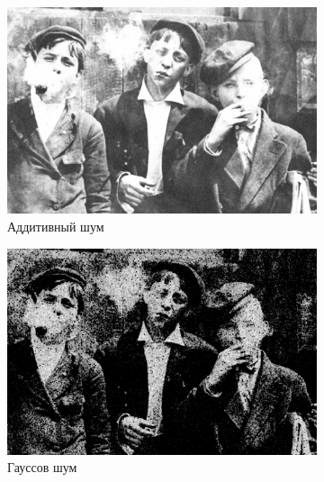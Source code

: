 \begin{figure}[ht]
\begin{subfigure}[b]{0.5\linewidth}
      \includegraphics[width=0.95\linewidth]{../Contraharmonic_Filter/Contraharmonic_Additive_noise_(m,n=(3,_3),q=-0.5).jpg} 
      \caption{Аддитивный шум} 
      \label{contraharmonic_-0.5:c} 
      \vspace{4ex}
    \end{subfigure}%
    \begin{subfigure}[b]{0.5\linewidth}
      \centering
      \includegraphics[width=0.95\linewidth]{../Contraharmonic_Filter/Contraharmonic_Gaussian_noise_(m,n=(3,_3),q=-0.5).jpg} 
      \caption{Гауссов шум} 
      \label{contraharmonic_-0.5:d} 
      \vspace{4ex}
    \end{subfigure}
    \begin{subfigure}[b]{0.5\linewidth}
      \centering

\end{subfigure}
\end{figure}
